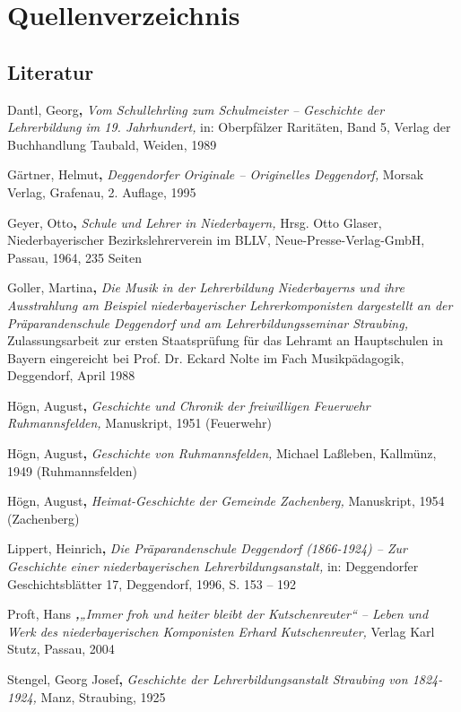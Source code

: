 \section{Quellenverzeichnis}

\subsection{Literatur}

Dantl, Georg\textbf{,} \textit{Vom Schullehrling zum Schulmeister –
Geschichte der Lehrerbildung im 19. Jahrhundert,} in: Oberpfälzer
Raritäten, Band 5, Verlag der Buchhandlung Taubald, Weiden, 1989

Gärtner, Helmut\textbf{,} \textit{Deggendorfer Originale – Originelles
Deggendorf,} Morsak Verlag, Grafenau, 2. Auflage, 1995

Geyer, Otto\textbf{,} \textit{Schule und Lehrer in Niederbayern,} Hrsg.
Otto Glaser, Niederbayerischer Bezirkslehrerverein im BLLV,
Neue-Presse-Verlag-GmbH, Passau, 1964, 235 Seiten

Goller, Martina\textbf{,} \textit{Die Musik in der Lehrerbildung
Niederbayerns und ihre Ausstrahlung am Beispiel niederbayerischer
Lehrerkomponisten dargestellt an der Präparandenschule Deggendorf und
am Lehrerbildungsseminar Straubing,} Zulassungsarbeit zur ersten
Staatsprüfung für das Lehramt an Hauptschulen in Bayern eingereicht
bei Prof. Dr. Eckard Nolte im Fach Musikpädagogik, Deggendorf, April
1988

Högn, August\textbf{,} \textit{Geschichte und Chronik der freiwilligen
Feuerwehr Ruhmannsfelden,} Manuskript, 1951 (Feuerwehr)

Högn, August\textbf{,} \textit{Geschichte von Ruhmannsfelden,} Michael
Laßleben, Kallmünz, 1949 (Ruhmannsfelden)

Högn, August\textbf{,} \textit{Heimat-Geschichte der Gemeinde
Zachenberg,} Manuskript, 1954 (Zachenberg)

Lippert, Heinrich\textbf{,} \textit{Die Präparandenschule Deggendorf
(1866-1924) – Zur Geschichte einer niederbayerischen
Lehrerbildungsanstalt,} in: Deggendorfer Geschichtsblätter 17,
Deggendorf, 1996, S. 153 – 192

Proft, Hans \textbf{\textit{,}}\textit{„Immer froh und heiter bleibt der
Kutschenreuter“ – Leben und Werk des niederbayerischen Komponisten
Erhard Kutschenreuter,} Verlag Karl Stutz, Passau, 2004

Stengel, Georg Josef\textbf{,} \textit{Geschichte der
Lehrerbildungsanstalt Straubing von 1824-1924,} Manz, Straubing, 1925

